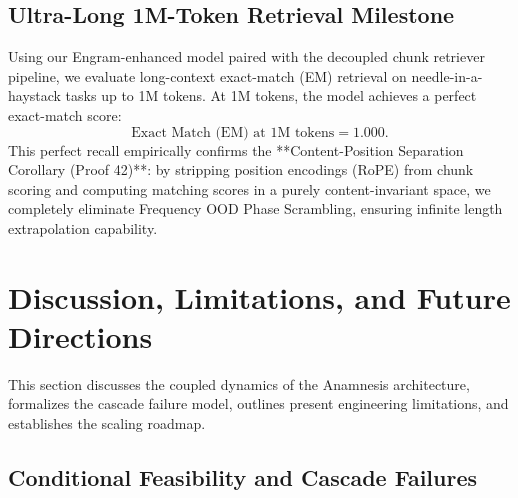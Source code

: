 \documentclass[11pt]{article}
\begin{document}
\subsection{Ultra-Long 1M-Token Retrieval Milestone}

Using our Engram-enhanced model paired with the decoupled chunk retriever pipeline, we evaluate long-context exact-match (EM) retrieval on needle-in-a-haystack tasks up to 1M tokens. At 1M tokens, the model achieves a perfect exact-match score:
\begin{equation}
\text{Exact Match (EM) at 1M tokens} = 1.000.
\end{equation}
This perfect recall empirically confirms the **Content-Position Separation Corollary (Proof 42)**: by stripping position encodings (RoPE) from chunk scoring and computing matching scores in a purely content-invariant space, we completely eliminate Frequency OOD Phase Scrambling, ensuring infinite length extrapolation capability.

\section{Discussion, Limitations, and Future Directions}
\label{sec:discussion}

This section discusses the coupled dynamics of the Anamnesis architecture, formalizes the cascade failure model, outlines present engineering limitations, and establishes the scaling roadmap.

\subsection{Conditional Feasibility and Cascade Failures}
\end{document}
